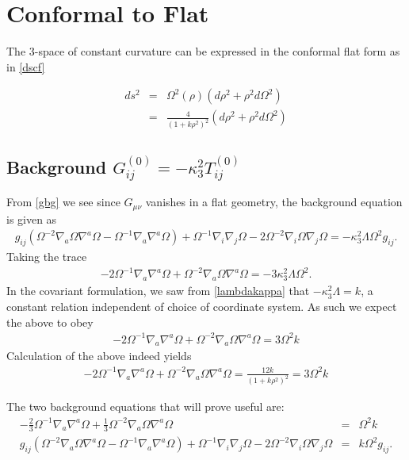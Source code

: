\documentclass[10pt,letterpaper]{article}
\numberwithin{equation}{section}
\begin{document}
\section{Conformal to Flat}

The 3-space of constant curvature can be expressed in the conformal flat form as in \eqref{dscf}

\begin{eqnarray}
ds^2 &=& \Omega^2(\rho)\left( d\rho^2 + \rho^2 d\Omega^2\right)
\nonumber\\
&=& \frac{4}{\left(1+k \rho^2\right)^2}\left( d\rho^2 + \rho^2 d\Omega^2\right)
\label{cfbg}
\end{eqnarray}
\subsection{Background $G^{(0)}_{ij} = -\kappa^2_3 T_{ij}^{(0)}$}
From \eqref{gbg} we see since $G_{\mu\nu}$ vanishes in a flat geometry, the background equation is given as
\begin{eqnarray}
 g_{ij}( \Omega^{-2} \nabla_{a}\Omega \nabla^{a}\Omega -\Omega^{-1} \nabla_{a}\nabla^{a}\Omega)+  \Omega^{-1} \nabla_{i}\nabla_{j}\Omega - 2 \Omega^{-2} \nabla_{i}\Omega \nabla_{j}\Omega 
= -\kappa_3^2 \Lambda \Omega^2 g_{ij}. 
\label{dgtbg}
\end{eqnarray}
Taking the trace
\begin{eqnarray}
-2\Omega^{-1} \nabla_a\nabla^a \Omega + \Omega^{-2} \nabla_a\Omega \nabla^a\Omega = -3\kappa_3^2 \Lambda \Omega^2.
\end{eqnarray}
In the covariant formulation, we saw from \eqref{lambdakappa} that $-\kappa^2_3\Lambda = k$, a constant relation independent of choice of coordinate system. As such we expect the above to obey
\begin{eqnarray}
-2\Omega^{-1} \nabla_a\nabla^a \Omega + \Omega^{-2} \nabla_a\Omega \nabla^a\Omega = 3\Omega^2 k
\end{eqnarray}
Calculation of the above indeed yields
\begin{eqnarray}
-2\Omega^{-1} \nabla_a\nabla^a \Omega + \Omega^{-2} \nabla_a\Omega \nabla^a\Omega = \frac{12k}{(1+k\rho^2)^2} = 3\Omega^2 k
\end{eqnarray}

The two background equations that will prove useful are:
\begin{eqnarray}
-\tfrac{2}{3} \Omega^{-1}\nabla_a \nabla^a \Omega + \tfrac{1}{3}\Omega^{-2}\nabla_a\Omega \nabla^a\Omega &=& \Omega^2 k
\label{bg1}
\\
g_{ij}( \Omega^{-2} \nabla_{a}\Omega \nabla^{a}\Omega -\Omega^{-1} \nabla_{a}\nabla^{a}\Omega)+  \Omega^{-1} \nabla_{i}\nabla_{j}\Omega - 2 \Omega^{-2} \nabla_{i}\Omega \nabla_{j}\Omega 
&=& k \Omega^2 g_{ij}.
\label{bg2}
\end{eqnarray}
\end{document}
